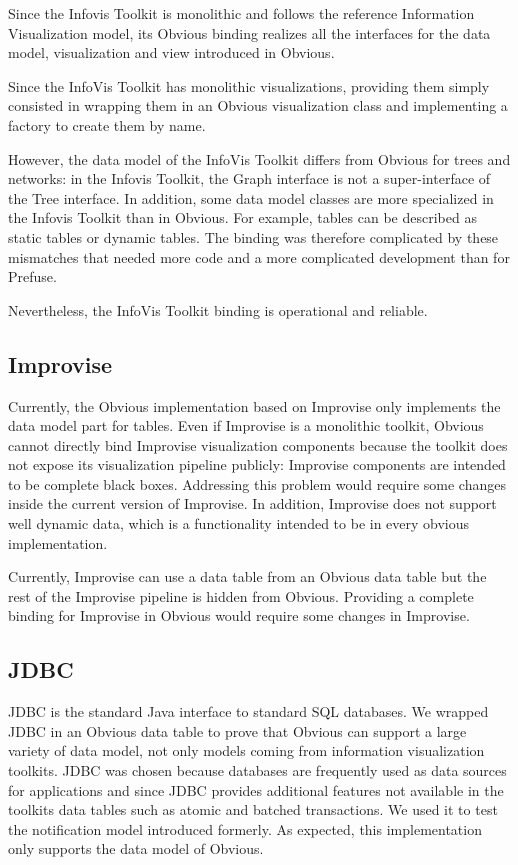Since the Infovis Toolkit is monolithic and follows the reference
Information Visualization model, its Obvious binding realizes all the
interfaces for the data model, visualization and view introduced in
Obvious.

Since the InfoVis Toolkit has monolithic visualizations, providing
them simply consisted in wrapping them in an Obvious visualization
class and implementing a factory to create them by name.

However, the data model of the InfoVis Toolkit differs from Obvious
for trees and networks: in the Infovis Toolkit, the Graph interface is
not a super-interface of the Tree interface.  In addition, some data
model classes are more specialized in the Infovis Toolkit than in
Obvious. For example, tables can be described as static tables or
dynamic tables.  The binding was therefore complicated by these
mismatches that needed more code and a more complicated development
than for Prefuse.

Nevertheless, the InfoVis Toolkit binding is operational and
reliable.

\subsection{Improvise}

Currently, the Obvious implementation based on Improvise only
implements the data model part for tables.  Even if Improvise is a
monolithic toolkit, Obvious cannot directly bind Improvise
visualization components because the toolkit does not expose its
visualization pipeline publicly: Improvise components are intended to
be complete black boxes.  Addressing this problem would require some
changes inside the current version of Improvise. In addition,
Improvise does not support well dynamic data, which is a functionality
intended to be in every obvious implementation.

Currently, Improvise can use a data table from an Obvious data table
but the rest of the Improvise pipeline is hidden from
Obvious. Providing a complete binding for Improvise in Obvious would
require some changes in Improvise.

\subsection{JDBC}

JDBC is the standard Java interface to standard SQL databases.  We
wrapped JDBC in an Obvious data table to prove that Obvious can
support a large variety of data model, not only models coming from
information visualization toolkits.  JDBC was chosen because databases
are frequently used as data sources for applications and since JDBC
provides additional features not available in the toolkits data tables
such as atomic and batched transactions.  We used it to test the
notification model introduced formerly.  As expected, this
implementation only supports the data model of Obvious.

